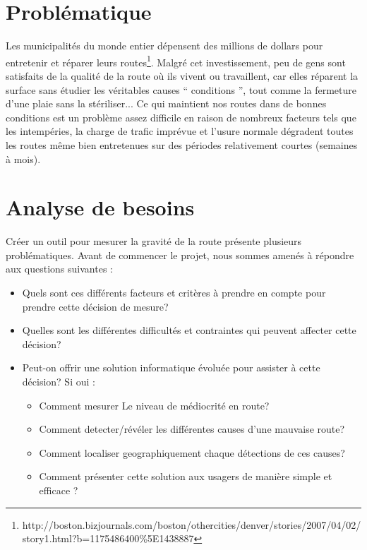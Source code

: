 \section{Problématique}
Les municipalités du monde entier dépensent des millions de dollars pour entretenir et réparer leurs 
routes\footnote{http://boston.bizjournals.com/boston/othercities/denver/stories/2007/04/02/story1.html?b=1175486400\%5E1438887}.
 Malgré cet investissement, peu de gens sont satisfaits de la qualité de la route où ils vivent ou travaillent, car elles 
 réparent la surface sans étudier les véritables causes `` conditions '', tout comme la fermeture d'une plaie 
 sans la stériliser...\newline
 Ce qui maintient nos routes dans de bonnes conditions est un problème assez difficile
  en raison de nombreux facteurs tels que les intempéries, la charge de trafic imprévue et l'usure normale 
  dégradent toutes les routes même bien entretenues sur des périodes relativement courtes (semaines à mois).

\section{Analyse de besoins}
Créer un outil pour mesurer la gravité de la route présente plusieurs problématiques. Avant de commencer le projet,  
 nous sommes amenés à répondre aux questions suivantes :
\begin{itemize}
	\item Quels sont ces différents facteurs et critères à prendre en compte pour prendre cette décision de mesure?
	\item Quelles sont les différentes difficultés et contraintes qui peuvent affecter cette décision?
	\item Peut-on offrir une solution informatique évoluée pour assister à cette décision? Si oui : 
        \begin{itemize}
            \item Comment mesurer Le niveau de médiocrité en route?
            \item Comment detecter/révéler les différentes causes d'une mauvaise route?
	      	  \item Comment localiser geographiquement chaque détections de ces causes?
	      	  \item Comment présenter cette solution aux usagers de manière simple et efficace ?
	      \end{itemize}
\end{itemize}

